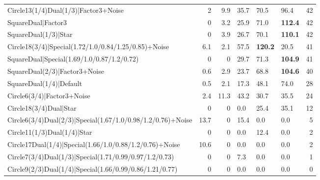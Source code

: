\begin{tabular}{lrrlllr}
 Circle13(1/4)Dual(1/3)|Factor3+Noise                         &          2   &            9.9 & 35.7           & 70.5           & 96.4           &           42 \\
 SquareDual|Factor3                                           &          0   &            3.2 & 25.9           & 71.0           & \textbf{112.4} &           42 \\
 SquareDual(1/3)|Star                                         &          0   &            3.9 & 26.7           & 70.1           & \textbf{110.1} &           42 \\
 Circle18(3/4)|Special(1.72/1.0/0.84/1.25/0.85)+Noise         &          6.1 &            2.1 & 57.5           & \textbf{120.2} & 20.5           &           41 \\
 SquareDual|Special(1.69/1.0/0.87/1.2/0.72)                   &          0   &            0   & 29.7           & 71.3           & \textbf{104.9} &           41 \\
 SquareDual(2/3)|Factor3+Noise                                &          0.6 &            2.9 & 23.7           & 68.8           & \textbf{104.6} &           40 \\
 SquareDual(1/4)|Default                                      &          0.5 &            2.1 & 17.3           & 48.1           & 74.0           &           28 \\
 Circle6(3/4)|Factor3+Noise                                   &          2.4 &           11.3 & 43.2           & 30.7           & 35.5           &           24 \\
 Circle18(3/4)Dual|Star                                       &          0   &            0   & 0.0            & 25.4           & 35.1           &           12 \\
 Circle6(3/4)Dual(2/3)|Special(1.67/1.0/0.98/1.2/0.76)+Noise  &         13.7 &            0   & 15.4           & 0.0            & 0.0            &            5 \\
 Circle11(1/3)Dual(1/4)|Star                                  &          0   &            0   & 0.0            & 12.4           & 0.0            &            2 \\
 Circle17Dual(1/4)|Special(1.66/1.0/0.88/1.2/0.76)+Noise      &         10.6 &            0   & 0.0            & 0.0            & 0.0            &            2 \\
 Circle7(3/4)Dual(1/3)|Special(1.71/0.99/0.97/1.2/0.73)       &          0   &            0   & 7.3            & 0.0            & 0.0            &            1 \\
 Circle9(2/3)Dual(1/4)|Special(1.66/0.99/0.86/1.21/0.77)      &          0   &            0   & 0.0            & 0.0            & 0.0            &            0 \\
\hline
\end{tabular}